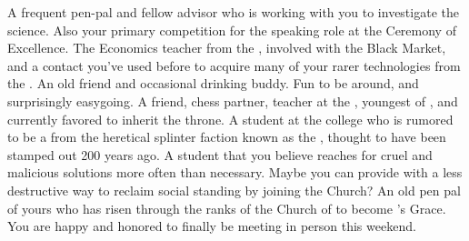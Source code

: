 \documentclass[char]{GL2020}
\begin{document}
\begin{contacts}
    \contact{\cCurse{}} A frequent pen-pal and fellow \pFarm{} advisor who is working with you to investigate the \pTech{} science. Also your primary competition for the speaking role at the Ceremony of Excellence.
    \contact{\cChupSecond{}} The Economics teacher from the \pShip{}, involved with the Black Market, and a contact you've used before to acquire many of your rarer technologies from the \pTech{}.
    \contact{\cWildCard{}} An old friend and occasional drinking buddy. Fun to be around, and surprisingly easygoing.
    \contact{\cPrince{}} A friend, chess partner, teacher at the \pSc{}, youngest \cPrince{\offspring} of \cQueen{\Monarch} \cQueen{}, and currently favored to inherit the throne.
    \contact{\cDisney{}} A student at the college who is rumored to be a \cDisney{\cleric} from the heretical splinter faction known as the \cDisneySect{}, thought to have been stamped out 200 years ago.
     \contact{\cLibAssist{}} A student that you believe reaches for cruel and malicious solutions more often than necessary. Maybe you can provide \cLibAssist{} with a less destructive way to reclaim social standing by joining the Church?
    \contact{\cAntiChup{}} An old pen pal of yours who has risen through the ranks of the Church of \cTechGod{} to become \cTechGod{}’s Grace. You are happy and honored to finally be meeting \cAntiChup{\them} in person this weekend.
\end{contacts}
\end{document}
